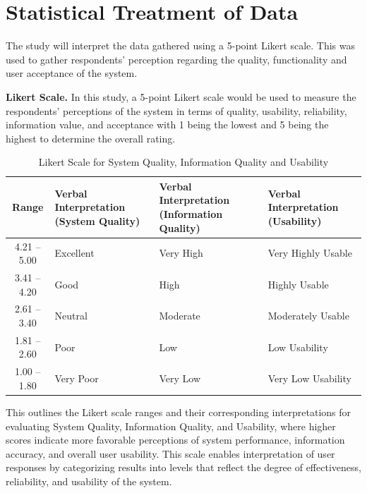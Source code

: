 \documentclass{research}
\begin{document}
\section{Statistical Treatment of Data}

The study will interpret the data gathered using a 5-point Likert scale. This was used to gather respondents' perception regarding the quality, functionality and user acceptance of the system.

\textbf{Likert Scale.} In this study, a 5-point Likert scale would be used to measure the respondents' perceptions of the system in terms of quality, usability, reliability, information value, and acceptance with 1 being the lowest and 5 being the highest to determine the overall rating.

\begin{table}[htbp]
\centering
\caption{Likert Scale for System Quality, Information Quality and Usability}
\label{tab:likert1}
\begin{tabularx}{\textwidth}{c|X|X|X}
\hline
\textbf{Range} & \textbf{Verbal Interpretation (System Quality)} & \textbf{Verbal Interpretation (Information Quality)} & \textbf{Verbal Interpretation (Usability)} \\
\hline
4.21 -- 5.00 & Excellent     & Very High  & Very Highly Usable \\
\hline
3.41 -- 4.20 & Good          & High       & Highly Usable      \\
\hline
2.61 -- 3.40 & Neutral       & Moderate   & Moderately Usable  \\
\hline
1.81 -- 2.60 & Poor          & Low        & Low Usability      \\
\hline
1.00 -- 1.80 & Very Poor     & Very Low   & Very Low Usability \\
\hline
\end{tabularx}
\end{table}

This outlines the Likert scale ranges and their corresponding interpretations for evaluating System Quality, Information Quality, and Usability, where higher scores indicate more favorable perceptions of system performance, information accuracy, and overall user usability. This scale enables interpretation of user responses by categorizing results into levels that reflect the degree of effectiveness, reliability, and usability of the system.
\end{document}
